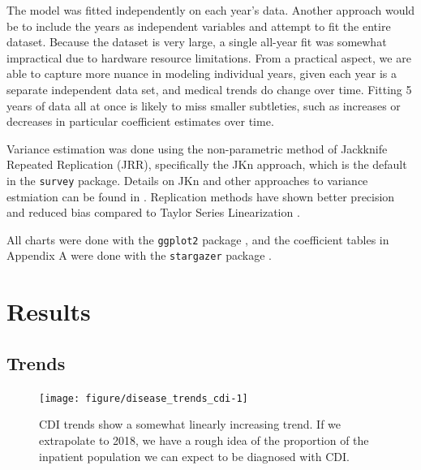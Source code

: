\documentclass[12pt]{ociamthesis}\usepackage[]{graphicx}\usepackage[]{color}
\newenvironment{knitrout}{}{} %
\begin{document}
The model was fitted independently on each year's data. 
Another approach would be to include the years as independent variables and attempt to fit the entire dataset. Because the dataset is very large,
a single all-year fit was somewhat impractical due to hardware resource limitations. From a practical aspect, we are able to capture more nuance in modeling individual
years, given each year is a separate independent data set, and medical trends do change over time. Fitting 5 years of data all at once is likely to miss smaller subtleties, 
such as increases or decreases in particular coefficient estimates over time. 

Variance estimation was done using the non-parametric method of Jackknife Repeated Replication (JRR), 
specifically the JKn approach, which is the default in the \texttt{survey} package. Details on JKn and other approaches
to variance estmiation can be found in \cite{Heeringa2017}.
Replication methods have shown better precision and reduced bias compared to Taylor Series Linearization \cite{Chowdhury2013, Smith2000}. 

All charts were done with the \texttt{ggplot2} package \cite{Wickham2016}, and the coefficient tables in Appendix A were done with the \texttt{stargazer} package \cite{Hlavac2018}. 

\chapter{Results}


\section{Trends}

\begin{knitrout}
\color{fgcolor}\begin{figure}

{\centering \texttt{[image: figure/disease\_trends\_cdi-1]} 

}

\caption[CDI trends show a somewhat linearly increasing trend]{CDI trends show a somewhat linearly increasing trend. If we extrapolate to 2018, we have a rough idea of the proportion of the inpatient population we can expect to be diagnosed with CDI.}\label{fig:disease_trends_cdi}
\end{figure}


\end{knitrout}
\label{fig:disease_trends_cdi}
\end{document}
